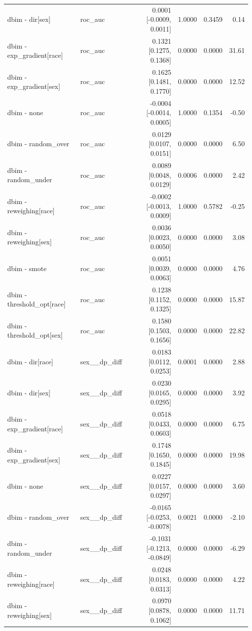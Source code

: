 \begin{table}[t]
{\begin{tabular}{llrrrr}
dbim - dir[sex] & roc\_auc & 0.0001 [-0.0009, 0.0011] & 1.0000 & 0.3459 & 0.14 \\
dbim - exp\_gradient[race] & roc\_auc & 0.1321 [0.1275, 0.1368] & 0.0000 & 0.0000 & 31.61 \\
dbim - exp\_gradient[sex] & roc\_auc & 0.1625 [0.1481, 0.1770] & 0.0000 & 0.0000 & 12.52 \\
dbim - none & roc\_auc & -0.0004 [-0.0014, 0.0005] & 1.0000 & 0.1354 & -0.50 \\
dbim - random\_over & roc\_auc & 0.0129 [0.0107, 0.0151] & 0.0000 & 0.0000 & 6.50 \\
dbim - random\_under & roc\_auc & 0.0089 [0.0048, 0.0129] & 0.0006 & 0.0000 & 2.42 \\
dbim - reweighing[race] & roc\_auc & -0.0002 [-0.0013, 0.0009] & 1.0000 & 0.5782 & -0.25 \\
dbim - reweighing[sex] & roc\_auc & 0.0036 [0.0023, 0.0050] & 0.0000 & 0.0000 & 3.08 \\
dbim - smote & roc\_auc & 0.0051 [0.0039, 0.0063] & 0.0000 & 0.0000 & 4.76 \\
dbim - threshold\_opt[race] & roc\_auc & 0.1238 [0.1152, 0.1325] & 0.0000 & 0.0000 & 15.87 \\
dbim - threshold\_opt[sex] & roc\_auc & 0.1580 [0.1503, 0.1656] & 0.0000 & 0.0000 & 22.82 \\
dbim - dir[race] & sex\_\_dp\_diff & 0.0183 [0.0112, 0.0253] & 0.0001 & 0.0000 & 2.88 \\
dbim - dir[sex] & sex\_\_dp\_diff & 0.0230 [0.0165, 0.0295] & 0.0000 & 0.0000 & 3.92 \\
dbim - exp\_gradient[race] & sex\_\_dp\_diff & 0.0518 [0.0433, 0.0603] & 0.0000 & 0.0000 & 6.75 \\
dbim - exp\_gradient[sex] & sex\_\_dp\_diff & 0.1748 [0.1650, 0.1845] & 0.0000 & 0.0000 & 19.98 \\
dbim - none & sex\_\_dp\_diff & 0.0227 [0.0157, 0.0297] & 0.0000 & 0.0000 & 3.60 \\
dbim - random\_over & sex\_\_dp\_diff & -0.0165 [-0.0253, -0.0078] & 0.0021 & 0.0000 & -2.10 \\
dbim - random\_under & sex\_\_dp\_diff & -0.1031 [-0.1213, -0.0849] & 0.0000 & 0.0000 & -6.29 \\
dbim - reweighing[race] & sex\_\_dp\_diff & 0.0248 [0.0183, 0.0313] & 0.0000 & 0.0000 & 4.22 \\
dbim - reweighing[sex] & sex\_\_dp\_diff & 0.0970 [0.0878, 0.1062] & 0.0000 & 0.0000 & 11.71 \\

\end{tabular}}
\end{table}

